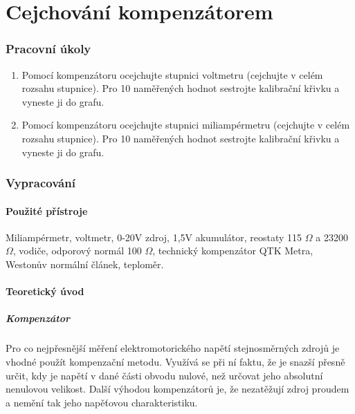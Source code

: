 \documentclass[english]{article}
\begin{document}




\setlength{\parindent}{0.5cm}

\part{Cejchování kompenzátorem}

\section{Pracovní úkoly}
\begin{enumerate}
  \item Pomocí kompenzátoru ocejchujte stupnici voltmetru (cejchujte v celém rozsahu stupnice). Pro 10 naměřených hodnot sestrojte kalibrační křivku a vyneste ji do grafu.
  \item Pomocí kompenzátoru ocejchujte stupnici miliampérmetru (cejchujte v celém rozsahu stupnice). Pro 10 naměřených hodnot sestrojte kalibrační křivku a vyneste ji do grafu.
\end{enumerate}

\section{Vypracování}

\subsection{Použité přístroje}
Miliampérmetr, voltmetr, 0-20V zdroj, 1,5V akumulátor, reostaty 115 $\Omega$ a 23200 $\Omega$, vodiče, odporový normál 100 $\Omega$, technický kompenzátor QTK Metra, Westonův normální článek, teploměr.

\subsection{Teoretický úvod}
\subsubsection{Kompenzátor}
Pro co nejpřesnější měření elektromotorického napětí stejnosměrných zdrojů je vhodné použít kompenzační metodu. Využívá se při ní faktu, že je snazší přesně určit, kdy je napětí v dané části obvodu nulové, než určovat jeho absolutní nenulovou velikost. Další výhodou kompenzátorů je, že nezatěžují zdroj proudem a nemění tak jeho napěťovou charakteristiku. 
\end{document}
